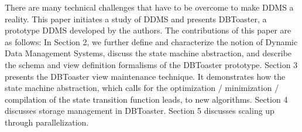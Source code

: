 There are many technical challenges that have to be overcome to make DDMS a reality. This paper initiates a study of DDMS and presents DBToaster, a prototype DDMS developed by the authors. The contributions of this paper are as follows:
In Section 2, we further define and characterize the notion of Dynamic Data Management Systems, discuss the state machine abstraction, and describe the schema and view definition formalisms of the DBToaster prototype.
Section 3 presents the DBToaster view maintenance technique. It demonstrates how the state machine abstraction, which calls for the optimization / minimization / compilation of the state transition function leads, to new algorithms.
Section 4 discusses storage management in DBToaster.
Section 5 discusses scaling up through parallelization.

